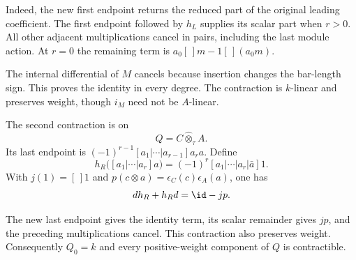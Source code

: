 Indeed, the new first endpoint returns the reduced part of the original leading coefficient.
The first endpoint followed by $h_L$ supplies its scalar part when $r>0$.
All other adjacent multiplications cancel in pairs, including the last module action.
At $r=0$ the remaining term is $a_0[\,]m-1[\,](a_0m)$.

The internal differential of $M$ cancels because insertion changes the bar-length sign.
This proves the identity in every degree.
The contraction is $k$-linear and preserves weight, though $i_M$ need not be $A$-linear.

The second contraction is on
\[
 Q=C\widehat\otimes_\tau A.
\]
Its last endpoint is $(-1)^{r-1}[a_1|\cdots|a_{r-1}]a_ra$.
Define
\begin{equation}\label{eq:cbc:modules:right-contraction}
 h_R\bigl([a_1|\cdots|a_r]a\bigr)
   =(-1)^r[a_1|\cdots|a_r|\bar a]1.
\end{equation}
With $j(1)=[\,]1$ and $p(c\otimes a)=\epsilon_C(c)\epsilon_A(a)$, one has
\[
 d h_R+h_Rd=\id-jp.
\]

The new last endpoint gives the identity term, its scalar remainder gives $jp$, and the preceding multiplications cancel.
This contraction also preserves weight.
Consequently $Q_0=k$ and every positive-weight component of $Q$ is contractible.

